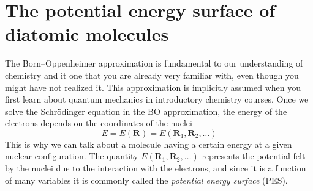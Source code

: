\documentclass[../Main/chem371-notes.tex]{subfiles}
\begin{document}
\section{The potential energy surface of diatomic molecules}

The Born--Oppenheimer approximation is fundamental to our understanding of chemistry and  it one that you are already very familiar with, even though you might have not realized it.
This approximation is implicitly assumed when you first learn about quantum mechanics in introductory chemistry courses.
Once we solve the Schr\"{o}dinger equation in the BO approximation, the energy of the electrons depends on the coordinates of the nuclei
\begin{equation}
E = E(\mathbf{R})= E(\mathbf{R}_1,  \mathbf{R}_2,\ldots)
\end{equation}
This is why we can talk about a molecule having a certain energy at a given nuclear configuration.
The quantity $E(\mathbf{R}_1,  \mathbf{R}_2,\ldots)$ represents the potential felt by the nuclei due to the interaction with the electrons, and since it is a function of many variables it is commonly called the \emph{potential energy surface} (PES).
\end{document}

